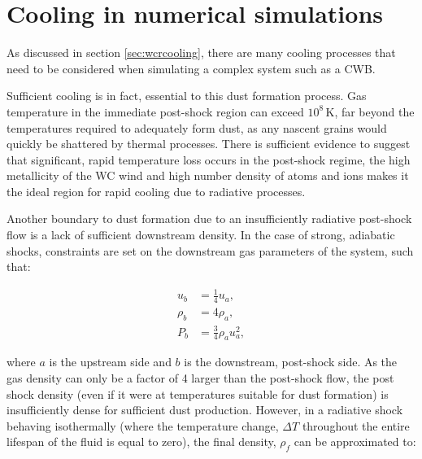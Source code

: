 



\section{Cooling in numerical simulations}

As discussed in section \ref{sec:wcrcooling}, there are many cooling processes that need to be considered when simulating a complex system such as a CWB.

Sufficient cooling is in fact, essential to this dust formation process.
Gas temperature in the immediate post-shock region can exceed $10^8\, \si{\kelvin}$, far beyond the temperatures required to adequately form dust, as any nascent grains would quickly be shattered by thermal processes.
There is sufficient evidence to suggest that significant, rapid temperature loss occurs in the post-shock regime, the high metallicity of the WC wind and high number density of atoms and ions makes it the ideal region for rapid cooling due to radiative processes.

Another boundary to dust formation due to an insufficiently radiative post-shock flow is a lack of sufficient downstream density.
In the case of strong, adiabatic shocks, constraints are set on the downstream gas parameters of the system, such that:

\begin{subequations}
  \begin{align}
    u_b    & = \frac{1}{4} u_a , \\
    \rho_b & = 4 \rho_a , \\ 
    P_b    & = \frac{3}{4} \rho_a u_a^2 ,
  \end{align}
\end{subequations}

\noindent
where $a$ is the upstream side and $b$ is the downstream, post-shock side.
As the gas density can only be a factor of 4 larger than the post-shock flow, the post shock density (even if it were at  temperatures suitable for dust formation) is insufficiently dense for sufficient dust production.
However, in a radiative shock behaving isothermally (where the temperature change, $\Delta T$ throughout the entire lifespan of the fluid is equal to zero), the final density, $\rho_f$ can be approximated to:

